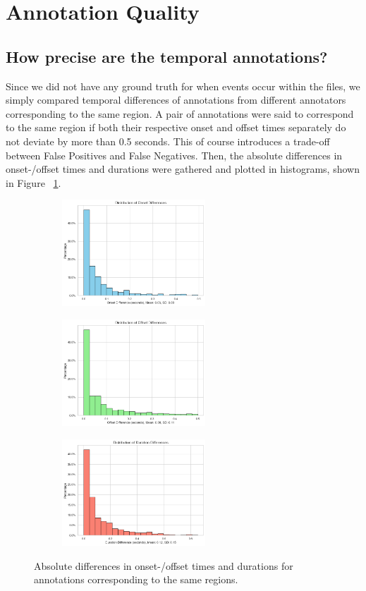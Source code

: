 \section{Annotation Quality} 
\label{sec:Annotation Quality}


\subsection{How precise are the temporal annotations?}
\label{sec:Annotation Quality:a1}
Since we did not have any ground truth for when events occur within the files, we simply compared temporal differences of annotations from different annotators corresponding to the same region. A pair of annotations were said to correspond to the same region if both their respective onset and offset times separately do not deviate by more than 0.5 seconds. This of course introduces a trade-off between False Positives and False Negatives.
Then, the absolute differences in onset-/offset times and durations were gathered and plotted in histograms, shown in Figure ~\ref{fig:2_a}.

\begin{figure}[htbp]
  \centering
  \begin{subfigure}[b]{0.33\textwidth}
    \includegraphics[width=\textwidth, height=4cm]{figs/onset_diffs.png}
  \end{subfigure}
  \hfill
  \begin{subfigure}[b]{0.33\textwidth}
    \includegraphics[width=\textwidth, height=4cm]{figs/offset_diffs.png}
  \end{subfigure}
  \hfill
  \begin{subfigure}[b]{0.33\textwidth}
    \includegraphics[width=\textwidth, height=4cm]{figs/duration_diffs.png}
  \end{subfigure}
  \caption{Absolute differences in onset-/offset times and durations for annotations corresponding to the same regions.}
  \label{fig:2_a}
\end{figure}

